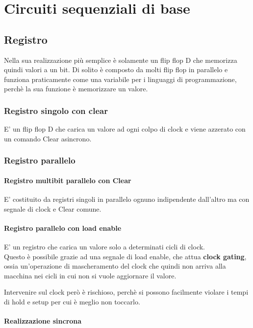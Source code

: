 \documentclass[a4paper]{book}
\begin{document}
\chapter{Circuiti sequenziali di base}

\section{Registro}

Nella sua realizzazione più semplice è solamente un flip flop D che memorizza quindi valori a un bit.
Di solito è composto da molti flip flop in parallelo e funziona praticamente come una variabile per i linguaggi di programmazione, perchè la sua funzione è memorizzare un valore.

\subsection{Registro singolo con clear}

E' un flip flop D che carica un valore ad ogni colpo di clock e viene azzerato con un comando Clear asincrono.
\subsection{Registro parallelo}

\subsubsection*{Registro multibit parallelo con Clear}

E' costituito da registri singoli in parallelo ognuno indipendente dall'altro ma con segnale di clock e Clear comune.

\subsubsection*{Registro parallelo con load enable}

E' un registro che carica un valore solo a determinati cicli di clock.\\
Questo è possibile grazie ad una segnale di load enable, che attua \textbf{clock gating}, ossia un'operazione di mascheramento del clock che quindi non arriva alla macchina nei cicli in cui non si vuole aggiornare il valore.

Intervenire sul clock però è rischioso, perchè si possono facilmente violare i tempi di hold e setup per cui è meglio non toccarlo.


\subsubsection*{Realizzazione sincrona}
\end{document}

